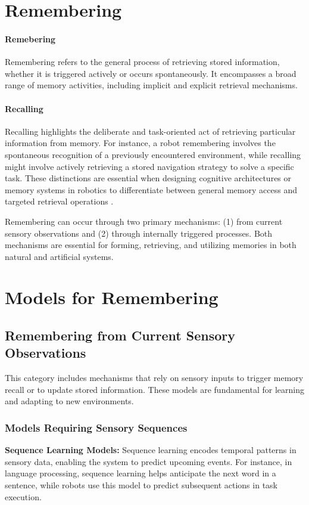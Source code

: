 \section{Remembering}
    \paragraph{Remebering}
        Remembering refers to the general process of retrieving stored information, whether it is triggered actively or occurs spontaneously. It encompasses a broad range of memory activities, including implicit and explicit retrieval mechanisms. 
        
    \paragraph{Recalling}
     Recalling highlights the deliberate and task-oriented act of retrieving particular information from memory. For instance, a robot remembering involves the spontaneous recognition of a previously encountered environment, while recalling might involve actively retrieving a stored navigation strategy to solve a specific task. These distinctions are essential when designing cognitive architectures or memory systems in robotics to differentiate between general memory access and targeted retrieval operations .

    Remembering can occur through two primary mechanisms: (1) from current sensory observations and (2) through internally triggered processes. Both mechanisms are essential for forming, retrieving, and utilizing memories in both natural and artificial systems.

\section{Models for Remembering}

    \subsection{Remembering from Current Sensory Observations}
    This category includes mechanisms that rely on sensory inputs to trigger memory recall or to update stored information. These models are fundamental for learning and adapting to new environments.

        \subsubsection{Models Requiring Sensory Sequences}
            \textbf{Sequence Learning Models:} Sequence learning encodes temporal patterns in sensory data, enabling the system to predict upcoming events. For instance, in language processing, sequence learning helps anticipate the next word in a sentence, while robots use this model to predict subsequent actions in task execution. 

